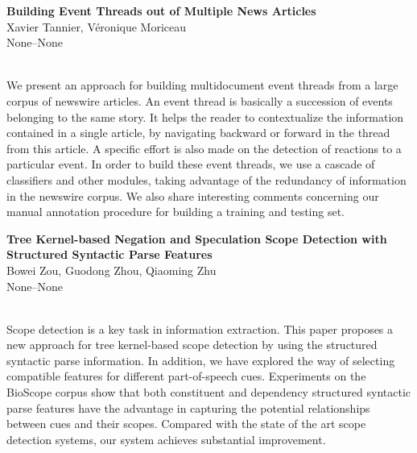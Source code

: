 \documentclass[twoside,makeidx]{book}
\renewcommand{\normalsize}{\fontsize{8}{9}\selectfont}
\renewcommand{\small}{\fontsize{7}{8}\selectfont}
\begin{document}
\par\vspace{2em}\noindent%
\begin{minipage}{\linewidth}%
\begin{center}
\textbf{\normalsize Building Event Threads out of Multiple News Articles}\\
\normalsize  Xavier Tannier,  V\'{e}ronique Moriceau\\
{\small None--None}\\
\end{center}
\end{minipage}\\[0.5em]
\nopagebreak%
\noindent%
{\small We present an approach for building multidocument event threads from a large corpus of newswire articles. An event thread is basically a succession of events belonging to the same story. It helps the reader to contextualize the information contained in a single article, by navigating backward or forward in the thread from this article. A specific effort is also made on the detection of reactions to a particular event.   In order to build these event threads, we use a cascade of classifiers and other modules, taking advantage of the redundancy of information in the newswire corpus.   We also share interesting comments concerning our manual annotation procedure for building a training and testing set.}
\par\vspace{2em}\noindent%
\begin{minipage}{\linewidth}%
\begin{center}
\textbf{\normalsize Tree Kernel-based Negation and Speculation Scope Detection with Structured Syntactic Parse Features}\\
\normalsize  Bowei Zou,  Guodong Zhou,  Qiaoming Zhu\\
{\small None--None}\\
\end{center}
\end{minipage}\\[0.5em]
\nopagebreak%
\noindent%
{\small Scope detection is a key task in information extraction. This paper proposes a new approach for tree kernel-based scope detection by using the structured syntactic parse information. In addition, we have explored the way of selecting compatible features for different part-of-speech cues. Experiments on the BioScope corpus show that both constituent and dependency structured syntactic parse features have the advantage in capturing the potential relationships between cues and their scopes. Compared with the state of the art scope detection systems, our system achieves substantial improvement.}
\end{document}
